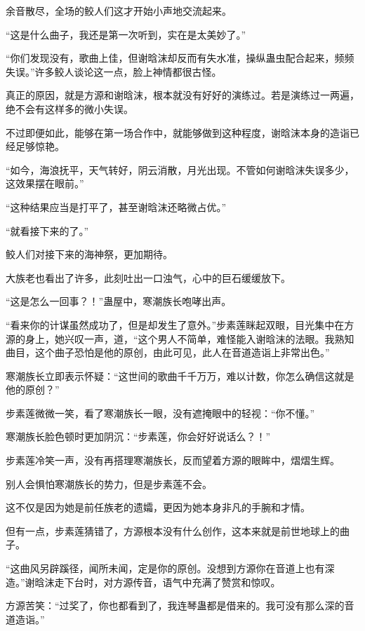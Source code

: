 
\begin{this_body}

余音散尽，全场的鲛人们这才开始小声地交流起来。

“这是什么曲子，我还是第一次听到，实在是太美妙了。”

“你们发现没有，歌曲上佳，但谢晗沫却反而有失水准，操纵蛊虫配合起来，频频失误。”许多鲛人谈论这一点，脸上神情都很古怪。

真正的原因，就是方源和谢晗沫，根本就没有好好的演练过。若是演练过一两遍，绝不会有这样多的微小失误。

不过即便如此，能够在第一场合作中，就能够做到这种程度，谢晗沫本身的造诣已经足够惊艳。

“如今，海浪抚平，天气转好，阴云消散，月光出现。不管如何谢晗沫失误多少，这效果摆在眼前。”

“这种结果应当是打平了，甚至谢晗沫还略微占优。”

“就看接下来的了。”

鲛人们对接下来的海神祭，更加期待。

大族老也看出了许多，此刻吐出一口浊气，心中的巨石缓缓放下。

“这是怎么一回事？！”蛊屋中，寒潮族长咆哮出声。

“看来你的计谋虽然成功了，但是却发生了意外。”步素莲眯起双眼，目光集中在方源的身上，她兴叹一声，道，“这个男人不简单，难怪能入谢晗沫的法眼。我熟知曲目，这个曲子恐怕是他的原创，由此可见，此人在音道造诣上非常出色。”

寒潮族长立即表示怀疑：“这世间的歌曲千千万万，难以计数，你怎么确信这就是他的原创？”

步素莲微微一笑，看了寒潮族长一眼，没有遮掩眼中的轻视：“你不懂。”

寒潮族长脸色顿时更加阴沉：“步素莲，你会好好说话么？！”

步素莲冷笑一声，没有再搭理寒潮族长，反而望着方源的眼眸中，熠熠生辉。

别人会惧怕寒潮族长的势力，但是步素莲不会。

这不仅是因为她是前任族老的遗孀，更因为她本身非凡的手腕和才情。

但有一点，步素莲猜错了，方源根本没有什么创作，这本来就是前世地球上的曲子。

“这曲风另辟蹊径，闻所未闻，定是你的原创。没想到方源你在音道上也有深造。”谢晗沫走下台时，对方源传音，语气中充满了赞赏和惊叹。

方源苦笑：“过奖了，你也都看到了，我连琴蛊都是借来的。我可没有那么深的音道造诣。”


\end{this_body}
